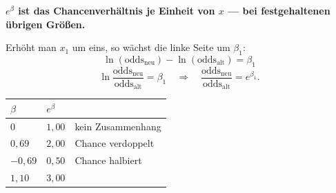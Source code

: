 \begin{merksatz}
\begin{center}
\begin{minipage}{0.9\textwidth}
\textbf{$e^{\beta}$ ist das Chancenverhältnis je Einheit von $x$ --- bei festgehaltenen übrigen Größen.}
\end{minipage}
\end{center}

Erhöht man $x_1$ um eins, so wächst die linke Seite um $\beta_1$:
\[ \ln(\mathrm{odds}_{\text{neu}}) - \ln(\mathrm{odds}_{\text{alt}}) = \beta_1 \]
\[ \ln\frac{\mathrm{odds}_{\text{neu}}}{\mathrm{odds}_{\text{alt}}} = \beta_1 \quad\Longrightarrow\quad \frac{\mathrm{odds}_{\text{neu}}}{\mathrm{odds}_{\text{alt}}} = e^{\beta_1} . \]

\begin{center}
\renewcommand{\arraystretch}{1.45}
\begin{tabular}{@{}P{2.0cm}P{2.2cm}P{3.4cm}@{}}
\toprule
$\beta$ & $e^{\beta}$ & \\
\midrule
$0$ & $1{,}00$ & kein Zusammenhang\\
$0{,}69$ & $2{,}00$ & Chance verdoppelt\\
$-0{,}69$ & $0{,}50$ & Chance halbiert\\
$1{,}10$ & $3{,}00$ & \\
\bottomrule
\end{tabular}
\end{center}
\end{merksatz}

